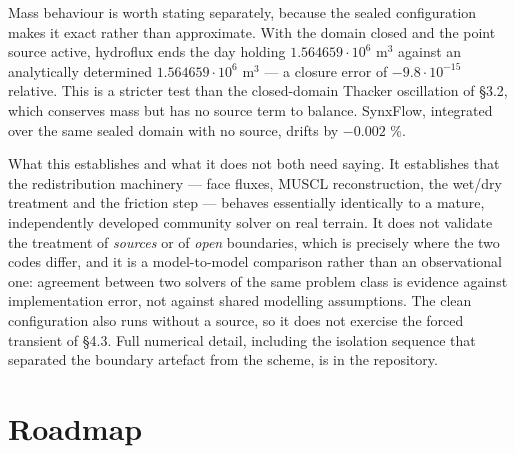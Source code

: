 Mass behaviour is worth stating separately, because the sealed
configuration makes it exact rather than approximate. With the domain
closed and the point source active, hydroflux ends the day holding
\(1.564659\cdot 10^{6}\) m$^{3}$ against an analytically determined
\(1.564659\cdot 10^{6}\) m$^{3}$ --- a closure error of
\(-9.8\cdot 10^{-15}\) relative. This is a stricter test than the
closed-domain Thacker oscillation of §3.2, which conserves mass but has
no source term to balance. SynxFlow, integrated over the same sealed
domain with no source, drifts by \(-0.002\) \%.

What this establishes and what it does not both need saying. It
establishes that the redistribution machinery --- face fluxes, MUSCL
reconstruction, the wet/dry treatment and the friction step --- behaves
essentially identically to a mature, independently developed community
solver on real terrain. It does not validate the treatment of
\emph{sources} or of \emph{open} boundaries, which is precisely where
the two codes differ, and it is a model-to-model comparison rather than
an observational one: agreement between two solvers of the same problem
class is evidence against implementation error, not against shared
modelling assumptions. The clean configuration also runs without a
source, so it does not exercise the forced transient of §4.3. Full
numerical detail, including the isolation sequence that separated the
boundary artefact from the scheme, is in the repository.

\section{Roadmap}

